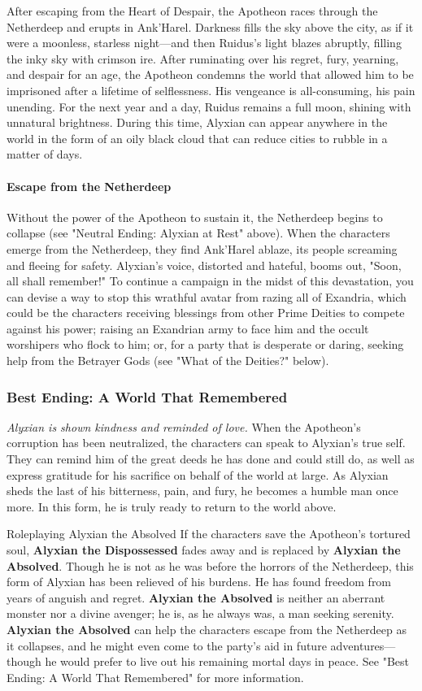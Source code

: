 \documentclass[10pt,a4,twoside,twocolumn,openany,nodeprecatedcode]{dndbook}
\begin{document}
After escaping from the Heart of Despair, the Apotheon races through the Netherdeep and erupts in Ank'Harel. Darkness fills the sky above the city, as if it were a moonless, starless night—and then Ruidus's light blazes abruptly, filling the inky sky with crimson ire.
After ruminating over his regret, fury, yearning, and despair for an age, the Apotheon condemns the world that allowed him to be imprisoned after a lifetime of selflessness. His vengeance is all-consuming, his pain unending. For the next year and a day, Ruidus remains a full moon, shining with unnatural brightness. During this time, Alyxian can appear anywhere in the world in the form of an oily black cloud that can reduce cities to rubble in a matter of days.
\paragraph{Escape from the Netherdeep}
Without the power of the Apotheon to sustain it, the Netherdeep begins to collapse (see "Neutral Ending: Alyxian at Rest" above). When the characters emerge from the Netherdeep, they find Ank'Harel ablaze, its people screaming and fleeing for safety. Alyxian's voice, distorted and hateful, booms out, "Soon, all shall remember!"
To continue a campaign in the midst of this devastation, you can devise a way to stop this wrathful avatar from razing all of Exandria, which could be the characters receiving blessings from other Prime Deities to compete against his power; raising an Exandrian army to face him and the occult worshipers who flock to him; or, for a party that is desperate or daring, seeking help from the Betrayer Gods (see "What of the Deities?" below).
\subsubsection{Best Ending: A World That Remembered}
\textit{Alyxian is shown kindness and reminded of love.}
When the Apotheon's corruption has been neutralized, the characters can speak to Alyxian's true self. They can remind him of the great deeds he has done and could still do, as well as express gratitude for his sacrifice on behalf of the world at large. As Alyxian sheds the last of his bitterness, pain, and fury, he becomes a humble man once more. In this form, he is truly ready to return to the world above.
\begin{DndComment}{Roleplaying Alyxian the Absolved}
If the characters save the Apotheon's tortured soul, \textbf{Alyxian the Dispossessed} fades away and is replaced by \textbf{Alyxian the Absolved}. Though he is not as he was before the horrors of the Netherdeep, this form of Alyxian has been relieved of his burdens. He has found freedom from years of anguish and regret. \textbf{Alyxian the Absolved} is neither an aberrant monster nor a divine avenger; he is, as he always was, a man seeking serenity.
\textbf{Alyxian the Absolved} can help the characters escape from the Netherdeep as it collapses, and he might even come to the party's aid in future adventures—though he would prefer to live out his remaining mortal days in peace. See "Best Ending: A World That Remembered" for more information.
\end{DndComment}
\end{document}

